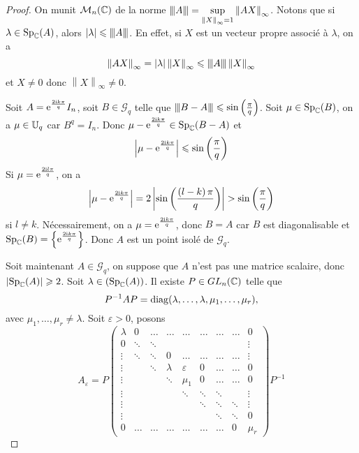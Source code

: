 \documentclass[12pt]{article}
\begin{document}
\begin{proof}
	On munit $\mathcal{M}_{n}(\mathbb{C})$ de la norme ${\left\vert\kern-0.25ex\left\vert\kern-0.25ex\left\vert{}A \right\vert\kern-0.25ex\right\vert\kern-0.25ex\right\vert}=\sup\limits_{\left\lVert X\right\rVert_{\infty}=1}\left\lVert AX\right\rVert_{\infty}$. Notons que si $\lambda\in\operatorname{Sp}_{\mathbb{C}}(A)$, alors $\left\lvert\lambda\right\rvert\leqslant{\left\vert\kern-0.25ex\left\vert\kern-0.25ex\left\vert{}A \right\vert\kern-0.25ex\right\vert\kern-0.25ex\right\vert}$. En effet, si $X$ est un vecteur propre associé à $\lambda$, on a 
	\begin{equation}
		\left\lVert AX\right\rVert_{\infty}=\left\lvert\lambda\right\rvert\left\lVert X\right\rVert_{\infty}\leqslant{\left\vert\kern-0.25ex\left\vert\kern-0.25ex\left\vert{}A \right\vert\kern-0.25ex\right\vert\kern-0.25ex\right\vert}\left\lVert X\right\rVert_{\infty}
	\end{equation}
	et $X\neq0$ donc $\left\lVert X\right\rVert_{\infty}\neq0$.

	Soit $A=\mathrm{e}^{\frac{2\mathrm{i} k\pi}{q}}I_{n}$, soit $B\in \mathcal{G}_{q}$ telle que ${\left\vert\kern-0.25ex\left\vert\kern-0.25ex\left\vert{}B-A \right\vert\kern-0.25ex\right\vert\kern-0.25ex\right\vert}\leqslant\sin\left(\frac{\pi}{q}\right)$. Soit $\mu\in\operatorname{Sp}_{\mathbb{C}}(B)$, on a $\mu\in\mathbb{U}_{q}$ car $B^{q}=I_{n}$. Donc $\mu-\mathrm{e}^{\frac{2\mathrm{i} k\pi}{q}}\in\operatorname{Sp}_{\mathbb{C}}(B-A)$ et 
	\begin{equation}
		\left\lvert\mu-\mathrm{e}^{\frac{2\mathrm{i} k\pi}{q}}\right\rvert\leqslant\sin\left(\frac{\pi}{q}\right)
	\end{equation}
	Si $\mu=\mathrm{e}^{\frac{2\mathrm{i} l\pi}{q}}$, on a 
	\begin{equation}
		\left\lvert\mu-\mathrm{e}^{\frac{2\mathrm{i} k\pi}{q}}\right\rvert=2\left\lvert\sin\left(\frac{\left(l-k\right)\pi}{q}\right)\right\rvert>\sin\left(\frac{\pi}{q}\right)
	\end{equation}
	si $l\neq k$. Nécessairement, on a $\mu=\mathrm{e}^{\frac{2\mathrm{i} k\pi}{q}}$, donc $B=A$ car $B$ est diagonalisable et $\operatorname{Sp}_{\mathbb{C}}(B)=\left\lbrace\mathrm{e}^{\frac{2\mathrm{i} k\pi}{q}}\right\rbrace$. Donc $A$ est un point isolé de $\mathcal{G}_{q}$.

	Soit maintenant $A\in\mathcal{G}_{q}$, on suppose que $A$ n'est pas une matrice scalaire, donc $\left\lvert\operatorname{Sp}_{\mathbb{C}}(A)\right\rvert\geqslant2$. Soit $\lambda\in\left(\operatorname{Sp}_{\mathbb{C}}(A)\right)$.
	Il existe $P\in GL_{n}(\mathbb{C})$ telle que 
	\begin{equation*}
		P^{-1}AP=\operatorname{diag}(\lambda,\dots,\lambda,\mu_{1},\dots,\mu_{r}),
	\end{equation*}avec $\mu_{1},\dots,\mu_{r}\neq\lambda$. Soit $\varepsilon>0$, posons 
	\begin{equation}
		A_{\varepsilon}=P
		\begin{pmatrix}
			\lambda &0 &\dots&\dots &\dots&\dots&\dots&\dots&0\\
			0 & \ddots & \ddots &&&&&&\vdots\\
			\vdots &\ddots&\ddots&0&\dots&\dots&\dots&\dots&\vdots\\
			\vdots&&\ddots&\lambda & \varepsilon&0&\dots&\dots&0\\
			\vdots&&& \ddots & \mu_{1}&0&\dots&\dots&0\\
			\vdots&&&&\ddots&\ddots&\ddots&&\vdots\\
			\vdots&&&&&\ddots&\ddots&\ddots&\vdots\\
			\vdots&&&&&&\ddots&\ddots&0\\
			0&\dots&\dots&\dots&\dots&\dots&\dots&0&\mu_{r}
		\end{pmatrix}P^{-1}
	\end{equation}


\end{proof}
\end{document}
